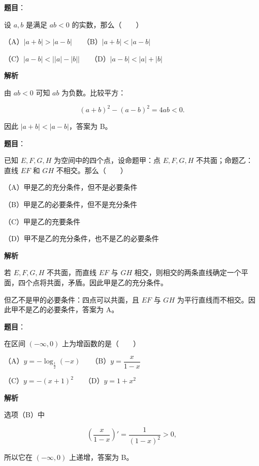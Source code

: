 \begin{answer}

\textbf{题目}：

设 $a,b$ 是满足 $ab<0$ 的实数，那么\mbox{（　　）}

（A）$|a+b|>|a-b|$　　（B）$|a+b|<|a-b|$

（C）$|a-b|<\bigl||a|-|b|\bigr|$　　（D）$|a-b|<|a|+|b|$

\textbf{解析}

由 $ab<0$ 可知 $ab$ 为负数。比较平方：

\nopagebreak[4]
\[
(a+b)^2-(a-b)^2=4ab<0.
\]

因此 $|a+b|<|a-b|$，答案为 B。


\end{answer}
\begin{answer}

\textbf{题目}：

已知 $E,F,G,H$ 为空间中的四个点，设命题甲：点 $E,F,G,H$ 不共面；命题乙：直线 $EF$ 和 $GH$ 不相交。那么\mbox{（　　）}

（A）甲是乙的充分条件，但不是必要条件

（B）甲是乙的必要条件，但不是充分条件

（C）甲是乙的充要条件

（D）甲不是乙的充分条件，也不是乙的必要条件

\textbf{解析}

若 $E,F,G,H$ 不共面，而直线 $EF$ 与 $GH$ 相交，则相交的两条直线确定一个平面，四个点将共面，矛盾。因此甲是乙的充分条件。

但乙不是甲的必要条件：四点可以共面，且 $EF$ 与 $GH$ 为平行直线而不相交。因此甲不是乙的必要条件，答案为 A。


\end{answer}
\begin{answer}

\textbf{题目}：

在区间 $(-\infty,0)$ 上为增函数的是\mbox{（　　）}

（A）$y=-\log_{\frac12}(-x)$　　（B）$y=\dfrac{x}{1-x}$

（C）$y=-(x+1)^2$　　（D）$y=1+x^2$

\textbf{解析}

选项（B）中

\nopagebreak[4]
\[
\left(\frac{x}{1-x}\right)'=\frac1{(1-x)^2}>0,
\]

所以它在 $(-\infty,0)$ 上递增，答案为 B。


\end{answer}
